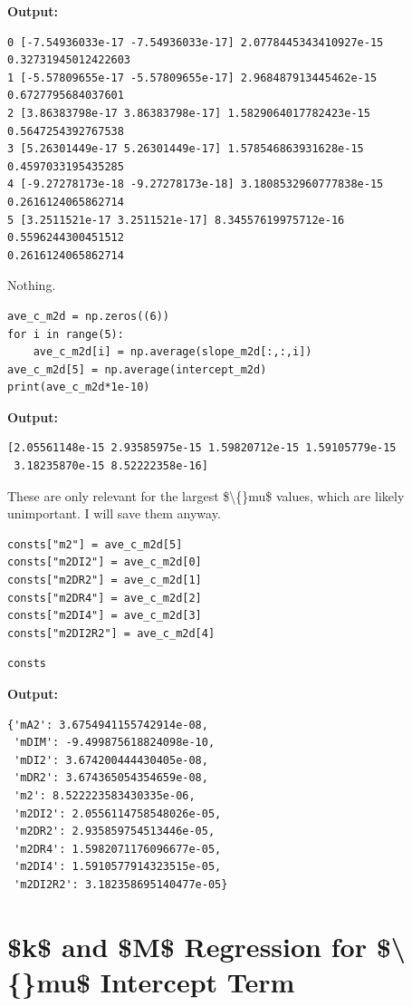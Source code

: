 \documentclass{article}
\begin{document}
\textbf{Output:}\begin{verbatim}
0 [-7.54936033e-17 -7.54936033e-17] 2.0778445343410927e-15 0.32731945012422603
1 [-5.57809655e-17 -5.57809655e-17] 2.968487913445462e-15 0.6727795684037601
2 [3.86383798e-17 3.86383798e-17] 1.5829064017782423e-15 0.5647254392767538
3 [5.26301449e-17 5.26301449e-17] 1.578546863931628e-15 0.4597033195435285
4 [-9.27278173e-18 -9.27278173e-18] 3.1808532960777838e-15 0.2616124065862714
5 [3.2511521e-17 3.2511521e-17] 8.34557619975712e-16 0.5596244300451512
0.2616124065862714

\end{verbatim}

Nothing. 

\begin{lstlisting}
ave_c_m2d = np.zeros((6))
for i in range(5):
    ave_c_m2d[i] = np.average(slope_m2d[:,:,i])
ave_c_m2d[5] = np.average(intercept_m2d)
print(ave_c_m2d*1e-10)\end{lstlisting}

\textbf{Output:}\begin{verbatim}
[2.05561148e-15 2.93585975e-15 1.59820712e-15 1.59105779e-15
 3.18235870e-15 8.52222358e-16]

\end{verbatim}

These are only relevant for the largest \$\textbackslash\{\}mu\$ values, which are likely unimportant. I will save them anyway.

\begin{lstlisting}
consts["m2"] = ave_c_m2d[5]
consts["m2DI2"] = ave_c_m2d[0]
consts["m2DR2"] = ave_c_m2d[1]
consts["m2DR4"] = ave_c_m2d[2]
consts["m2DI4"] = ave_c_m2d[3]
consts["m2DI2R2"] = ave_c_m2d[4]\end{lstlisting}

\begin{lstlisting}
consts\end{lstlisting}

\textbf{Output:}\begin{verbatim}
{'mA2': 3.6754941155742914e-08,
 'mDIM': -9.499875618824098e-10,
 'mDI2': 3.674200444430405e-08,
 'mDR2': 3.674365054354659e-08,
 'm2': 8.522223583430335e-06,
 'm2DI2': 2.0556114758548026e-05,
 'm2DR2': 2.935859754513446e-05,
 'm2DR4': 1.5982071176096677e-05,
 'm2DI4': 1.5910577914323515e-05,
 'm2DI2R2': 3.182358695140477e-05}
\end{verbatim}

\section{\$k\$ and \$M\$ Regression for \$\textbackslash\{\}mu\$ Intercept Term}
\end{document}
